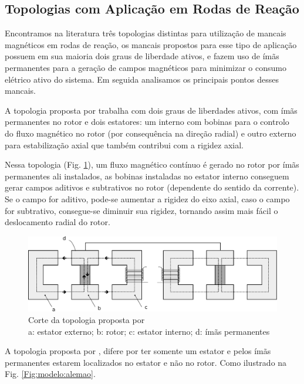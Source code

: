 \subsection{Topologias com Aplicação em Rodas de Reação}

Encontramos na literatura três topologias distintas para utilização de mancais magnéticos em rodas de reação, os mancais propostos para esse tipo de aplicação possuem em sua maioria dois graus de liberdade ativos,  e fazem uso de ímãs permanentes para a geração de campos magnéticos para minimizar o consumo elétrico ativo do sistema. Em seguida analisamos os principais pontos desses mancais.

A topologia proposta por \citet{Bernus1998} trabalha com dois graus de liberdades ativos, com ímãs permanentes no rotor e dois estatores: um interno com bobinas para o controlo do fluxo magnético no rotor (por consequência na direção radial) e outro externo para estabilização axial que também contribui com a rigidez axial. 

Nessa topologia (Fig. \ref{Fig:modelo:frances}), um fluxo magnético contínuo é gerado no rotor por ímãs permanentes ali instalados, as bobinas instaladas no estator interno conseguem gerar campos aditivos e subtrativos no rotor (dependente do sentido da corrente). Se o campo for aditivo, pode-se aumentar a rigidez do eixo axial, caso o campo for subtrativo, consegue-se diminuir sua rigidez, tornando assim mais fácil o deslocamento radial do rotor.

\begin{figure}[!ht]
	\centering
	\includegraphics[width=1\linewidth]{./Figs/mancais/frances}
	\caption{Corte da topologia proposta por \cite{Bernus1998} \\
	a: estator externo; b: rotor; c: estator interno; d: ímãs permanentes}
	\label{Fig:modelo:frances}
\end{figure}

A topologia proposta por \citet{Scharfe2001}, difere por ter somente um estator e pelos ímãs permanentes estarem localizados no estator e não no rotor. Como ilustrado na Fig. \ref{Fig:modelo:alemao}. 

